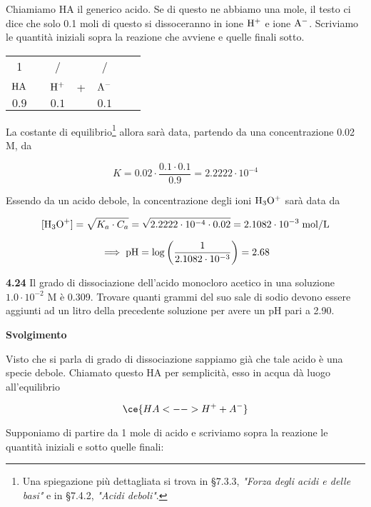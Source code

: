 \vspace{0.2cm} Chiamiamo HA il generico acido. Se di questo ne abbiamo una mole, il testo ci dice che solo 0.1 moli di questo si dissoceranno in ione $\rm H^+$ e ione $\rm A^-$. Scriviamo le quantità iniziali sopra la reazione che avviene e quelle finali sotto.

\begin{center}
    \begin{tabular}{ccccccc}
        1 & & / & & /\\
        $\rm HA$ & \ce{<-->} & $\rm H^+$ & + & $\rm A^-$\\
        $0.9$ & & $0.1$ & & $0.1$\\
    \end{tabular}
\end{center}

La costante di equilibrio\footnote{Una spiegazione più dettagliata si trova in §7.3.3, \textit{"Forza degli acidi e delle basi"} e in §7.4.2, \textit{"Acidi deboli"}.} allora sarà data, partendo da una concentrazione 0.02 M, da

$$K=0.02 \cdot \frac{0.1 \cdot 0.1}{0.9}=2.2222 \cdot 10^{-4}$$

Essendo da un acido debole, la concentrazione degli ioni $\rm H_3O^+$ sarà data da

$$[\text{H}_3\text{O}^+] = \sqrt{K_a \cdot C_a}
=\sqrt{2.2222 \cdot 10^{-4} \cdot 0.02}=2.1082 \cdot 10^{-3}\; \rm mol/L$$

$$\implies \rm pH=\log{\left(\frac{1}{2.1082 \cdot 10^{-3}}\right)}=2.68$$

\vspace{0.2cm}\textbf{4.24} Il grado di dissociazione dell'acido monocloro acetico in una soluzione $1.0 \cdot 10^{-2}$ M è 0.309. Trovare quanti grammi del suo sale di sodio devono essere aggiunti ad un litro della precedente soluzione per avere un pH pari a 2.90.

\vspace{0.2cm}\large\textbf{Svolgimento}\normalsize

\vspace{0.2cm}Visto che si parla di grado di dissociazione sappiamo già che tale acido è una specie debole. Chiamato questo HA per semplicità, esso in acqua dà luogo all'equilibrio

$$\ce{HA <--> H^+ + A^-}$$

Supponiamo di partire da 1 mole di acido e scriviamo sopra la reazione le quantità iniziali e sotto quelle finali:


